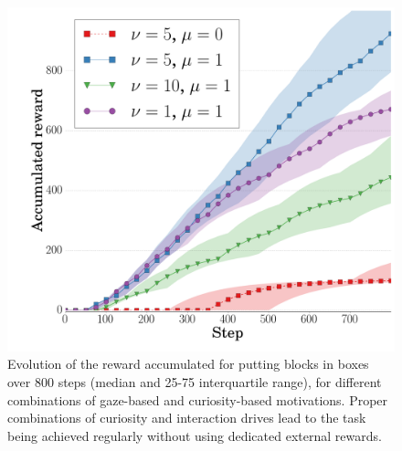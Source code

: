 \documentclass[letterpaper, 10 pt, conference]{ieeeconf}  %
\begin{document}
\begin{figure}[t!]
\includegraphics[width=\linewidth]{no_reward.png}
\caption{Evolution of the reward accumulated for putting blocks in boxes over 800 steps (median and 25-75 interquartile range), for different combinations of gaze-based and curiosity-based motivations. Proper combinations of curiosity and interaction drives lead to the task being achieved regularly without using dedicated external rewards.}
\label{noreward}
\end{figure}

\end{document}
